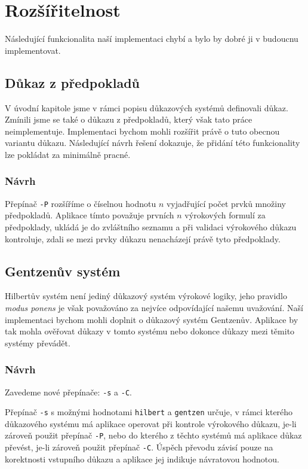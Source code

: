 \documentclass[thesis=B,czech,hidelinks]{FITthesis}[2012/06/26]
\begin{document}
%
%
%

\chapter{Rozšířitelnost}

Následující funkcionalita naší implementaci chybí a bylo by dobré ji v budoucnu implementovat.

\section{Důkaz z předpokladů}

V úvodní kapitole jsme v rámci popisu důkazových systémů definovali důkaz. Zmínili jsme se také o důkazu z předpokladů, který však tato práce neimplementuje. Implementaci bychom mohli rozšířit právě o tuto obecnou variantu důkazu. Následující návrh řešení dokazuje, že přidání této funkcionality lze pokládat za minimálně pracné.

\subsection{Návrh}

Přepínač \texttt{-P} rozšíříme o číselnou hodnotu $n$ vyjadřující počet prvků množiny předpokladů. Aplikace tímto považuje prvních $n$ výrokových formulí za předpoklady, ukládá je do zvláštního seznamu a při validaci výrokového důkazu kontroluje, zdali se mezi prvky důkazu nenacházejí právě tyto předpoklady.

\section{Gentzenův systém}

Hilbertův systém není jediný důkazový systém výrokové logiky, jeho pravidlo \emph{modus ponens} je však považováno za nejvíce odpovídající našemu uvažování. Naší implementaci bychom mohli doplnit o důkazový systém Gentzenův. Aplikace by tak mohla ověřovat důkazy v tomto systému nebo dokonce důkazy mezi těmito systémy převádět.

\subsection{Návrh}

Zavedeme nové přepínače: \texttt{-s} a \texttt{-C}.

Přepínač \texttt{-s} s možnými hodnotami \texttt{hilbert} a \texttt{gentzen} určuje, v rámci kterého důkazového systému má aplikace operovat při kontrole výrokového důkazu, je-li zároveň použit přepínač \texttt{-P}, nebo do kterého z těchto systémů má aplikace důkaz převést, je-li zároveň použit přepínač \texttt{-C}. Úspěch převodu závisí pouze na korektnosti vstupního důkazu a aplikace jej indikuje návratovou hodnotou.
\end{document}
